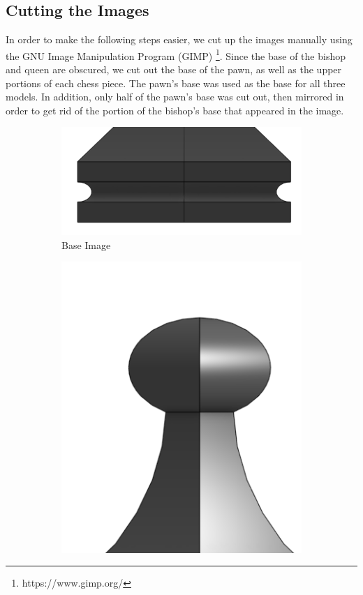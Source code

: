 \documentclass{IEEEtran}
\begin{document}
        \subsection{Cutting the Images}
            In order to make the following steps easier, we cut up the images manually using the GNU Image Manipulation Program (GIMP) \footnote[3]{https://www.gimp.org/}.  Since the base
            of the bishop and queen are obscured, we cut out the base of the pawn, as well as the upper portions of each chess piece.  The pawn's base was used as the base for all three
            models.  In addition, only half of the pawn's base was cut out, then mirrored in order to get rid of the portion of the bishop's base that appeared in the image.
            \begin{figure}
                \begin{subfigure}{.3\textwidth}
                    \includegraphics{../cut_images/base.png}
                    \caption{Base Image}
                \end{subfigure}
                \begin{subfigure}{.3\textwidth}
                    \includegraphics{../cut_images/pawn.png}

\end{subfigure}
\end{figure}
\end{document}
